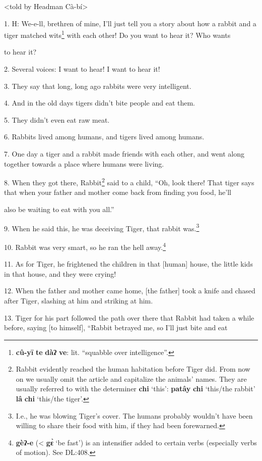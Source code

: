 \setcounter{footnote}{0}

<told by Headman Cà-bí>

1. H: We-e-ll, brethren of mine, I'll just tell you a story about how a rabbit
and a tiger matched wits\footnote{\textbf{cû-yī} \textbf{te} \textbf{dàʔ} \textbf{ve}: lit. ``squabble over intelligence''.} with each other! Do you want to hear it? Who wants


to hear it?

2. Several voices: I want to hear! I want to hear it!

3. They say that long, long ago rabbits were very intelligent.

4. And in the old days tigers didn't bite people and eat them.

5. They didn't even eat raw meat.

6. Rabbits lived among humans, and tigers lived among humans.

7. One day a tiger and a rabbit made friends with each other, and went along together
towards a place where humans were living.

8. When they got there, Rabbit\footnote{Rabbit evidently reached the human habitation before Tiger did. From now on we usually omit the article and capitalize the animals' names. They are usually referred to with the determiner \textbf{chi} `this': \textbf{patây} \textbf{chi} `this/the rabbit' \textbf{lâ} \textbf{chi} `this/the tiger'.} said to a child, ``Oh, look there! That tiger
says that when your father and mother come back from finding you food, he'll


also be waiting to eat with you all.''

9. When he said this, he was deceiving Tiger, that rabbit was.\footnote{I.e., he was blowing Tiger's cover. The humans probably wouldn't have been willing to share their food with him, if they had been forewarned.}

10. Rabbit was very smart, so he ran the hell away.\footnote{\textbf{gèʔ-e} (< \textbf{gɛ̀} `be fast') is an intensifier added to certain verbs (especially verbs of motion). See DL:408.}

11. As for Tiger, he frightened the children in that [human] house, the little
kids in that house, and they were crying!

12. When the father and mother came home, [the father] took a knife and chased
after Tiger, slashing at him and striking at him.

13. Tiger for his part followed the path over there that Rabbit had taken a while
before, saying [to himself], ``Rabbit betrayed me, so I'll just bite and eat


